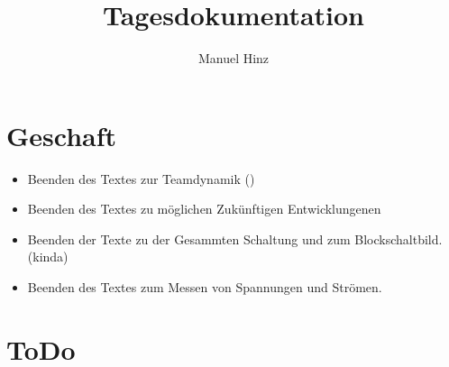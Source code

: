 \documentclass{article}
\author{Manuel Hinz}
\title{Tagesdokumentation}
\begin{document}
\maketitle


\section{Geschaft}

\begin{itemize}

\item Beenden des Textes zur Teamdynamik ()

\item Beenden des Textes zu m\"{o}glichen Zuk\"{u}nftigen Entwicklungenen 

\item Beenden der Texte zu der Gesammten Schaltung und zum Blockschaltbild. (kinda)

\item Beenden des Textes zum Messen von Spannungen und Str\"{o}men.

\end{itemize}

\section{ToDo}
\end{document}
